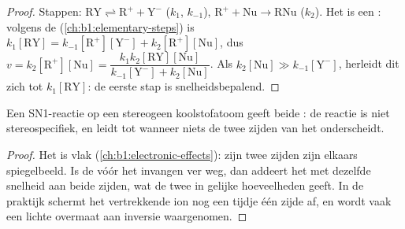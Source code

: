 \begin{proof}
Stappen: $\mathrm{RY} \rightleftharpoons \mathrm{R^+} + \mathrm{Y^-}$ ($k_1$,
$k_{-1}$), $\mathrm{R^+} + \mathrm{Nu} \to \mathrm{RNu}$ ($k_2$). Het
 is een : volgens de
 (\cref{ch:b1:elementary-steps}) is
$k_1[\mathrm{RY}] =
k_{-1}[\mathrm{R^+}][\mathrm{Y^-}] + k_2[\mathrm{R^+}][\mathrm{Nu}]$, dus
$v = k_2[\mathrm{R^+}][\mathrm{Nu}] = \dfrac{k_1k_2[\mathrm{RY}][\mathrm{Nu}]}
{k_{-1}[\mathrm{Y^-}] + k_2[\mathrm{Nu}]}$. Als $k_2[\mathrm{Nu}] \gg
k_{-1}[\mathrm{Y^-}]$, herleidt dit zich tot $k_1[\mathrm{RY}]$: de eerste
stap is snelheidsbepalend.
\end{proof}

\begin{proposition}\label{prop:b1:nucleophilic-substitution:sn1-stereo}
Een SN1-reactie op een stereogeen koolstofatoom geeft beide
: de reactie is niet stereospecifiek, en leidt tot
 wanneer niets de twee zijden van het 
onderscheidt.
\end{proposition}

\begin{proof}
Het  is vlak (\cref{ch:b1:electronic-effects}): zijn twee
zijden zijn elkaars spiegelbeeld. Is de  vóór het
invangen ver weg, dan addeert het  met dezelfde snelheid aan
beide zijden, wat de twee  in gelijke hoeveelheden geeft. In
de praktijk schermt het vertrekkende ion nog een tijdje één zijde af, en
wordt vaak een lichte overmaat aan inversie waargenomen.
\end{proof}

